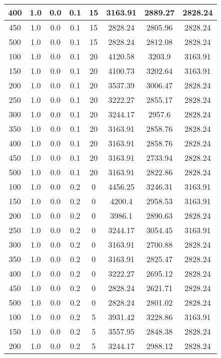 \documentclass[a4paper, 12pt]{extreport}
\begin{document}
\begin{itemize}
\begin{longtable}{|c|c|c|c|c|c|c|c|}
			400 & 1.0 & 0.0 & 0.1 & 15 & 3163.91 & 2889.27 & 2828.24 \\\hline
			450 & 1.0 & 0.0 & 0.1 & 15 & 2828.24 & 2805.96 & 2828.24 \\\hline
			500 & 1.0 & 0.0 & 0.1 & 15 & 2828.24 & 2812.08 & 2828.24 \\\hline
			100 & 1.0 & 0.0 & 0.1 & 20 & 4120.58 & 3203.9 & 3163.91 \\\hline
			150 & 1.0 & 0.0 & 0.1 & 20 & 4100.73 & 3202.64 & 3163.91 \\\hline
			200 & 1.0 & 0.0 & 0.1 & 20 & 3537.39 & 3006.47 & 2828.24 \\\hline
			250 & 1.0 & 0.0 & 0.1 & 20 & 3222.27 & 2855.17 & 2828.24 \\\hline
			300 & 1.0 & 0.0 & 0.1 & 20 & 3244.17 & 2957.6 & 2828.24 \\\hline
			350 & 1.0 & 0.0 & 0.1 & 20 & 3163.91 & 2858.76 & 2828.24 \\\hline
			400 & 1.0 & 0.0 & 0.1 & 20 & 3163.91 & 2858.76 & 2828.24 \\\hline
			450 & 1.0 & 0.0 & 0.1 & 20 & 3163.91 & 2733.94 & 2828.24 \\\hline
			500 & 1.0 & 0.0 & 0.1 & 20 & 3163.91 & 2822.86 & 2828.24 \\\hline
			100 & 1.0 & 0.0 & 0.2 & 0 & 4456.25 & 3246.31 & 3163.91 \\\hline
			150 & 1.0 & 0.0 & 0.2 & 0 & 4200.4 & 2958.53 & 3163.91 \\\hline
			200 & 1.0 & 0.0 & 0.2 & 0 & 3986.1 & 2890.63 & 2828.24 \\\hline
			250 & 1.0 & 0.0 & 0.2 & 0 & 3244.17 & 3054.45 & 3163.91 \\\hline
			300 & 1.0 & 0.0 & 0.2 & 0 & 3163.91 & 2700.88 & 2828.24 \\\hline
			350 & 1.0 & 0.0 & 0.2 & 0 & 3163.91 & 2825.47 & 2828.24 \\\hline
			400 & 1.0 & 0.0 & 0.2 & 0 & 3222.27 & 2695.12 & 2828.24 \\\hline
			450 & 1.0 & 0.0 & 0.2 & 0 & 2828.24 & 2621.71 & 2828.24 \\\hline
			500 & 1.0 & 0.0 & 0.2 & 0 & 2828.24 & 2801.02 & 2828.24 \\\hline
			100 & 1.0 & 0.0 & 0.2 & 5 & 3931.42 & 3228.86 & 3163.91 \\\hline
			150 & 1.0 & 0.0 & 0.2 & 5 & 3557.95 & 2848.38 & 2828.24 \\\hline
			200 & 1.0 & 0.0 & 0.2 & 5 & 3244.17 & 2988.12 & 2828.24 \\\hline

\end{longtable}
\end{itemize}
\end{document}
